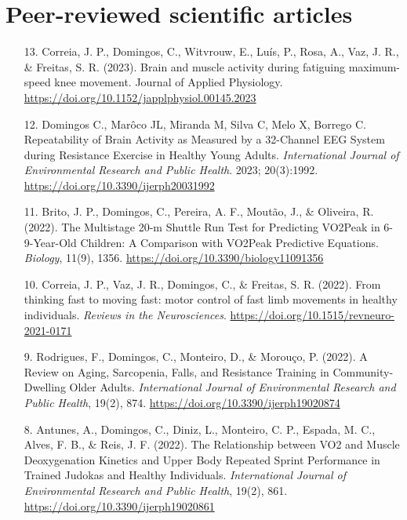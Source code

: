 \section*{Peer-reviewed scientific articles}

\begin{enumerate}

  \item[13.] Correia, J. P., Domingos, C., Witvrouw, E., Luís, P., Rosa, A., Vaz, J. R., & Freitas, S. R. (2023). Brain and muscle activity during fatiguing maximum-speed knee movement. Journal of Applied Physiology. \url{https://doi.org/10.1152/japplphysiol.00145.2023}

  \item[12.] Domingos C., Marôco JL, Miranda M, Silva C, Melo X, Borrego C. Repeatability of Brain Activity as Measured by a 32-Channel EEG System during Resistance Exercise in Healthy Young Adults. \emph{International Journal of Environmental Research and Public Health}. 2023; 20(3):1992. \url{https://doi.org/10.3390/ijerph20031992}

  \item[11.] Brito, J. P., Domingos, C., Pereira, A. F., Moutão, J., \& Oliveira, R. (2022). The Multistage 20-m Shuttle Run Test for Predicting VO2Peak in 6-9-Year-Old Children: A Comparison with VO2Peak Predictive Equations. \emph{Biology}, 11(9), 1356. \url{https://doi.org/10.3390/biology11091356}

  \item[10.] Correia, J. P., Vaz, J. R., Domingos, C., \& Freitas, S. R. (2022). From thinking fast to moving fast: motor control of fast limb movements in healthy individuals. \emph{Reviews in the Neurosciences}. \url{https://doi.org/10.1515/revneuro-2021-0171}

  \item[9.] Rodrigues, F., Domingos, C., Monteiro, D., \& Morouço, P. (2022). A Review on Aging, Sarcopenia, Falls, and Resistance Training in Community-Dwelling Older Adults. \emph{International Journal of Environmental Research and Public Health}, 19(2), 874. \url{https://doi.org/10.3390/ijerph19020874}

  \item[8.] Antunes, A., Domingos, C., Diniz, L., Monteiro, C. P., Espada, M. C., Alves, F. B., \& Reis, J. F. (2022). The Relationship between VO2 and Muscle Deoxygenation Kinetics and Upper Body Repeated Sprint Performance in Trained Judokas and Healthy Individuals. \emph{International Journal of Environmental Research and Public Health}, 19(2), 861. \url{https://doi.org/10.3390/ijerph19020861}


\end{enumerate}

